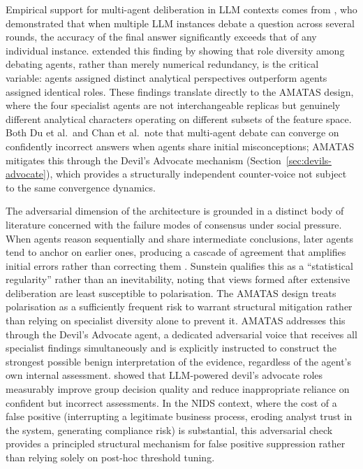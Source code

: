 \documentclass[../main.tex]{subfiles}
\begin{document}
Empirical support for multi-agent deliberation in LLM contexts comes from \textcite{Du2023}, who demonstrated that when multiple LLM instances debate a question across several rounds, the accuracy of the final answer significantly exceeds that of any individual instance. \textcite{Chan2023} extended this finding by showing that role diversity among debating agents, rather than merely numerical redundancy, is the critical variable: agents assigned distinct analytical perspectives outperform agents assigned identical roles. These findings translate directly to the AMATAS design, where the four specialist agents are not interchangeable replicas but genuinely different analytical characters operating on different subsets of the feature space. Both Du et al.\ and Chan et al.\ note that multi-agent debate can converge on confidently incorrect answers when agents share initial misconceptions; AMATAS mitigates this through the Devil's Advocate mechanism (Section~\ref{sec:devils-advocate}), which provides a structurally independent counter-voice not subject to the same convergence dynamics.

The adversarial dimension of the architecture is grounded in a distinct body of literature concerned with the failure modes of consensus under social pressure. When agents reason sequentially and share intermediate conclusions, later agents tend to anchor on earlier ones, producing a cascade of agreement that amplifies initial errors rather than correcting them \autocite{Sunstein2002}. Sunstein qualifies this as a ``statistical regularity'' rather than an inevitability, noting that views formed after extensive deliberation are least susceptible to polarisation. The AMATAS design treats polarisation as a sufficiently frequent risk to warrant structural mitigation rather than relying on specialist diversity alone to prevent it. AMATAS addresses this through the Devil's Advocate agent, a dedicated adversarial voice that receives all specialist findings simultaneously and is explicitly instructed to construct the strongest possible benign interpretation of the evidence, regardless of the agent's own internal assessment. \textcite{Yin2024} showed that LLM-powered devil's advocate roles measurably improve group decision quality and reduce inappropriate reliance on confident but incorrect assessments. In the NIDS context, where the cost of a false positive (interrupting a legitimate business process, eroding analyst trust in the system, generating compliance risk) is substantial, this adversarial check provides a principled structural mechanism for false positive suppression rather than relying solely on post-hoc threshold tuning.
\end{document}
